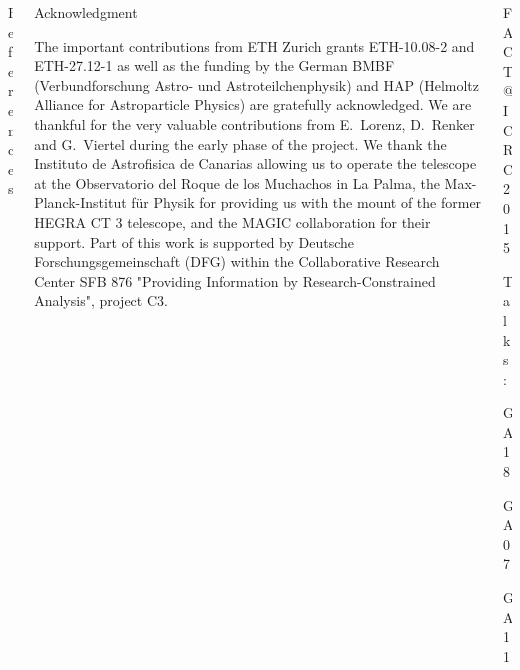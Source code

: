 \documentclass[t]{beamer}
\begin{document}
\vfill
\begin{columns}[t, onlytextwidth]%
  \begin{column}{0.42\textwidth}%
    \begin{block}[equal height group=bottom]{\normalsize References}
      \footnotesize%
      \printbibliography%
    \end{block}
  \end{column}%
  \begin{column}{0.42\textwidth}%
    \begin{block}[equal height group=bottom]{\normalsize Acknowledgment}
      \begin{multicols}{2}%
        \footnotesize
        The important contributions from ETH Zurich grants ETH-10.08-2 and ETH-27.12-1 as well as the funding by the German BMBF (Verbundforschung Astro- und Astroteilchenphysik) and HAP (Helmoltz Alliance for Astroparticle Physics) are gratefully acknowledged.
        We are thankful for the very valuable contributions from E.~Lorenz,  D.~Renker and G.~Viertel during the early phase of the project.
        We thank the Instituto de Astrofisica de Canarias allowing us to operate the telescope at the Observatorio del Roque de los Muchachos in La Palma, the Max-Planck-Institut f\"ur Physik for providing us with the mount of the former HEGRA CT 3 telescope, and the MAGIC collaboration for their support.
        Part of this work is supported by Deutsche Forschungsgemeinschaft (DFG) within the Collaborative Research Center SFB 876 "Providing Information by Research-Constrained Analysis", project C3. 
      \end{multicols}%
    \end{block}
  \end{column}%
  \begin{column}{0.16\textwidth}%
    \footnotesize
    \begin{block}[equal height group=bottom]{\normalsize FACT@ICRC2015}
      \begin{multicols}{2}
        Talks:
        \begin{description}[align=right, labelwidth=1.70cm, nosep]
          \item[704] GA 18 
          \item[806] GA 07
          \item[1032] GA 11
        \end{description}
        \vspace{0.5cm}
        \centering


\end{multicols}
\end{block}
\end{column}
\end{columns}
\end{document}
